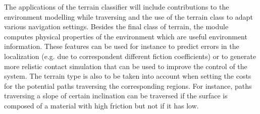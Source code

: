 \documentclass{article}
\begin{document}
The applications of the terrain classifier will include contributions to the environment modelling while traversing and the use of the terrain class to adapt various navigation settings.
Besides the final class of terrain, the module computes physical properties of the environment which are useful environment information. 
These features can be used for instance to predict errors in the localization (e.g. due to correspondent different fiction coefficients) or to generate more relistic contact simulation that can be used to improve the control of the system.
The terrain type is also to be taken into account when setting the costs for the potential paths traversing the corresponding regions. 
For instance, paths traversing a slope of certain inclination can be traversed if the surface is composed of a material with high friction but not if it has low.


\FloatBarrier



\end{document}
